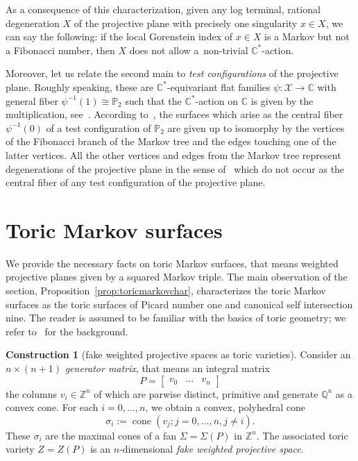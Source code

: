 \documentclass[pdftex]{sigma}
\theoremstyle{definition}
\newtheorem{constr}[thm]{Construction}
\def\CC{{\mathbb C}}
\def\ZZ{{\mathbb Z}}
\def\QQ{{\mathbb Q}}
\def\PP{{\mathbb P}}
\DeclareMathOperator{\cone}{cone}
\begin{document}
As a consequence of this characterization,
given any log terminal, rational degeneration $X$
of the projective plane with precisely one
singularity $x \in X$, we can say the following:
if the local Gorenstein index of $x \in X$ is a
Markov but not a Fibonacci number, then $X$ does
not allow a~non-trivial $\CC^*$-action.

Moreover, let us relate the second main to
\emph{test configurations} of the projective plane.
Roughly speaking, these are $\CC^*$-equivariant
flat families $\psi \colon \mathcal{X} \to \CC$
with general fiber $\psi^{-1}(1) \cong \PP_2$ such
that the $\CC^*$-action on $\CC$ is given by the
multiplication, see~\cite[Definition~A.1]{AsBeEtAl}.
According to~\mbox{\cite[Theorem~A.3]{AsBeEtAl}}, the surfaces
which arise as the central fiber $\psi^{-1}(0)$ of a test
configuration of $\PP_2$ are given up to isomorphy
by the vertices of the Fibonacci branch of
the Markov tree and the edges touching one of the latter
vertices.
All the other vertices and edges from the Markov tree
represent degenerations of the projective plane in the
sense of~\cite[Definition~1]{Ma} which do not occur as the
central fiber of any test configuration of the
projective plane.





\section{Toric Markov surfaces}


We provide the necessary facts on toric Markov surfaces,
that means weighted projective planes given by a squared
Markov triple.
The main observation of the section,
Proposition~\ref{prop:toricmarkovchar},
characterizes the toric Markov surfaces as the
toric surfaces of Picard number one and canonical
self intersection nine.
The reader is assumed to be familiar with the basics of
toric geometry; we refer to~\cite{CoLiSc} for the
background.

\begin{constr}[fake weighted projective spaces as toric varieties]
\label{constr:fwps}
Consider an $n \times (n+1)$ \emph{generator matrix},
that means an integral matrix
\[
P = \begin{bmatrix} v_0 & \dots & v_n \end{bmatrix}
\]
the columns $v_i \in \ZZ^n$ of which are parwise distinct,
primitive and generate $\QQ^n$ as a convex cone.
For each $i = 0, \dots, n$, we obtain a convex,
polyhedral cone
\[
\sigma_i := \cone(v_j; j = 0, \dots, n, j \ne i).
\]
These $\sigma_i$ are the maximal cones of a
fan $\Sigma = \Sigma(P)$ in $\ZZ^n$.
The associated toric variety $Z=Z(P)$ is an
$n$-dimensional \emph{fake weighted projective space}.
\end{constr}
\end{document}
